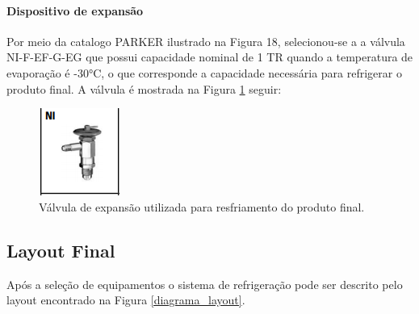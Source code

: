 \documentclass[10pt,a4paper]{article}
\begin{document}

\paragraph*{{ Dispositivo de expansão}}
Por meio da catalogo PARKER ilustrado na Figura 18, selecionou-se a a válvula NI-F-EF-G-EG que possui capacidade nominal de 1 TR quando a temperatura de evaporação é -30°C, o que corresponde a capacidade necessária para refrigerar o produto final. A válvula é mostrada na Figura \ref{valvula_resfriamento_produto} seguir:

\begin{figure}[H]
    \centering
    \includegraphics[scale = 1.5]{Figuras/valvula_leite.png}
    \caption{Válvula de expansão utilizada para resfriamento do produto final.}
    \label{valvula_resfriamento_produto}
\end{figure}

\subsection{{Layout Final}}

Após a seleção de equipamentos o sistema de refrigeração pode ser descrito pelo layout encontrado na Figura \ref{diagrama_layout}.
\end{document}

